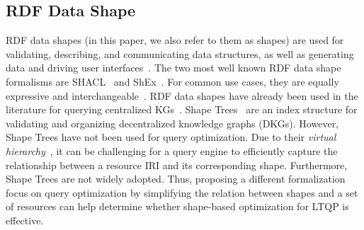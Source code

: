 \subsection{RDF Data Shape}
RDF data shapes (in this paper, we also refer to them as shapes) are used for validating, describing, and communicating data structures, as well as generating data and driving user interfaces~\cite{Gayo2018a,Gayo2018}.
The two most well known RDF data shape formalisms are SHACL~\cite{Gayo2018b} and ShEx~\cite{Gayo2018}.
For common use cases, they are equally expressive and interchangeable~\cite{Gayo2018c}.
RDF data shapes have already been used in the literature for querying centralized KGs~\cite{kashif2021}.
Shape Trees~\cite{shapetreesShapeTrees} are an index structure for validating and organizing decentralized knowledge graphs (DKGs).
However, Shape Trees have not been used for query optimization. 
Due to their \emph{virtual hierarchy}~\cite{shapetreesShapeTrees}, it can be challenging for a query engine to efficiently capture the relationship between a resource IRI and its corresponding shape.
Furthermore, Shape Trees are not widely adopted.
Thus, proposing a different formalization focus on query optimization by simplifying the relation between shapes and a set of resources can help determine whether shape-based optimization for LTQP is effective.

\iffalse
\rt{
    The following paragraph needs to be better structured.
    There's a lot of stuff in there, but it's not very coherent.
    It's introduced as source selection, but that's not accurate, as you mention SERVICE (which is an operator in SPARQL), summarization techniques for query optimization, ... Y
    ou also mix sparql federation and link traversal. 
    And then you end with some centralized techniques. 
    You may even want to have separate subsections for some of these topics. 
    Also think about what point you want to make for each subsection, and how it relates to your work (and then also make this clear to the reader).
}
\fi

